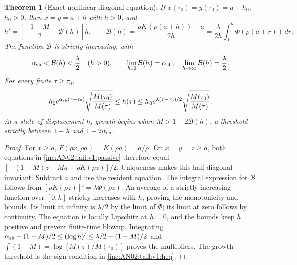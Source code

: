 \documentclass[11pt]{article}
\numberwithin{equation}{section}
\newtheorem{theorem}{Theorem}[section]
\theoremstyle{remark}\newtheorem{remark}[theorem]{Remark}
\newcommand{\dd}{\,d}
\newcommand{\1}{\mathbf 1}
\begin{document}
\begin{theorem}[Exact nonlinear diagonal equation]
\label{inc:AN02:tail:v1:nonlineardiagonal}
If $x(\tau_0)=y(\tau_0)=a+h_0$, $h_0>0$, then
$x=y=a+h$ with $h>0$, and
\begin{equation}\label{inc:AN02:tail:v1:heq}
 h'=\left[-\frac{1-M}{2}+\mathcal B(h)\right]h,\qquad
 \mathcal B(h)=\frac{\rho K(\rho(a+h))-a}{2h}
 =\frac\lambda{2h}\int_0^h\Phi(\rho(a+r))\dd r.
\end{equation}
The function $\mathcal B$ is strictly increasing, with
\begin{equation}\label{inc:AN02:tail:v1:Bhbounds}
 \alpha_{\rm sh}<\mathcal B(h)<\frac\lambda2\quad(h>0),\qquad
 \lim_{h\downarrow0}\mathcal B(h)=\alpha_{\rm sh},\quad
 \lim_{h\to\infty}\mathcal B(h)=\frac\lambda2.
\end{equation}
For every finite $\tau\ge\tau_0$,
\begin{equation}\label{inc:AN02:tail:v1:nonlinearmultipliers}
 h_0e^{\alpha_{\rm sh}(\tau-\tau_0)}
 \sqrt{\frac{M(\tau_0)}{M(\tau)}}
 \le h(\tau)\le
 h_0e^{\lambda(\tau-\tau_0)/2}
 \sqrt{\frac{M(\tau_0)}{M(\tau)}}.
\end{equation}
At a state of displacement $h$, growth begins when
$M>1-2\mathcal B(h)$, a threshold strictly between
$1-\lambda$ and $1-2\alpha_{\rm sh}$.
\end{theorem}
\begin{proof}
For $x\ge a$, $F(\rho x,\rho a)=K(\rho a)=a/\rho$.
On $x=y=z\ge a$, both equations in
\eqref{inc:AN02:tail:v1:passive} therefore equal
$[-(1-M)z-Ma+\rho K(\rho z)]/2$.
Uniqueness makes this half-diagonal invariant. Subtract $a$ and use the
resident equation. The integral expression for $\mathcal B$ follows from
$[\rho K(\rho z)]'=\lambda\Phi(\rho z)$. An average of a strictly
increasing function over $[0,h]$ strictly increases with $h$, proving the
monotonicity and bounds. Its limit at infinity is $\lambda/2$ by the
limit of $\Phi$; its limit at zero follows by continuity.
The equation is locally Lipschitz at $h=0$, and the bounds keep $h$
positive and prevent finite-time blowup. Integrating
$\alpha_{\rm sh}-(1-M)/2\le(\log h)'\le\lambda/2-(1-M)/2$
and $\int(1-M)=\log[M(\tau)/M(\tau_0)]$ proves the multipliers.
The growth threshold is the sign condition in \eqref{inc:AN02:tail:v1:heq}.
\end{proof}
\end{document}
